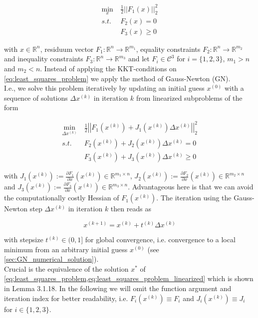 \documentclass{scrartcl}[12pt, halfparskip]
\numberwithin{equation}{section}
\numberwithin{figure}{section}
\numberwithin{table}{section}
\begin{document}
\begin{align}
	\min_x \ & \frac{1}{2}|| F_1(x) ||_2^2 \label{eq:least_squares_problem} \\
	s.t. \ & F_2(x) = 0 \nonumber \\
	& F_3(x) \ge 0 \nonumber
\end{align}

with $x \in \mathbb{R}^n$, residuum vector $F_1: \mathbb{R}^n \rightarrow \mathbb{R}^{m_1}$, equality constraints $F_2: \mathbb{R}^n \rightarrow \mathbb{R}^{m_2}$ and inequality constraints $F_3: \mathbb{R}^n \rightarrow \mathbb{R}^{m_3}$ and let $F_i \in \mathcal{C}^3$ for $i=\{1,2,3\}$, $m_1 > n$ and $m_2 < n$.
Instead of applying the KKT-conditions on \cref{eq:least_squares_problem} we apply the method of Gauss-Newton (GN). \\
I.e., we solve this problem iteratively by updating an initial guess $x^{(0)}$ with a sequence of solutions $\Delta x^{(k)}$ in iteration $k$ from linearized subproblems of the form

\begin{align}
\min_{\Delta x^{(k)}} \ & \frac{1}{2} \left| \left| F_1(x^{(k)}) + J_1(x^{(k)}) \Delta x^{(k)} \right|\right|_2^2 \label{eq:least_squares_problem_linearized} \\
s.t. \ & F_2(x^{(k)}) + J_2(x^{(k)}) \Delta x^{(k)} = 0 \nonumber \\
& F_3(x^{(k)}) + J_3(x^{(k)}) \Delta x^{(k)} \ge 0 \nonumber
\end{align}

with $J_1(x^{(k)}) := \frac{\partial F_1}{\partial x}(x^{(k)}) \in \mathbb{R}^{m_1 \times n}$, $J_2(x^{(k)}) := \frac{\partial F_2}{\partial x}(x^{(k)}) \in \mathbb{R}^{m_2 \times n}$ and $J_3(x^{(k)}) := \frac{\partial F_3}{\partial x}(x^{(k)}) \in \mathbb{R}^{m_3 \times n}$. Advantageous here is that we can avoid the computationally costly Hessian of $F_1(x^{(k)})$. The iteration using the Gauss-Newton step $\Delta x^{(k)}$ in iteration $k$ then reads as

\begin{equation}
x^{(k+1)} = x^{(k)} + t^{(k)} \Delta x^{(k)}
\label{eq:Gauss_Newton_iteration}
\end{equation}

with stepsize $t^{(k)} \in (0,1]$ for global convergence, i.e. convergence to a local minimum from an arbitrary initial guess $x^{(0)}$ (see \cref{sec:GN_numerical_solution}). \\
Crucial is the equivalence of the solution $x^*$ of \cref{eq:least_squares_problem,eq:least_squares_problem_linearized} which is shown in \cite{diss_bock} Lemma 3.1.18.
In the following we will omit the function argument and iteration index for better readability, i.e. $F_i(x^{(k)}) \equiv F_i$ and $J_i(x^{(k)}) \equiv J_i$ for $i \in \{1,2,3\}$. \\
\end{document}
